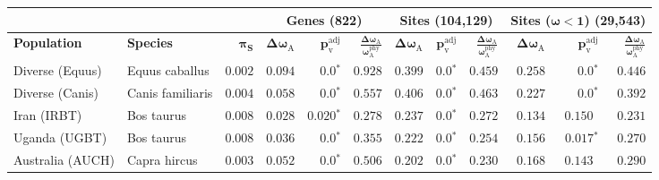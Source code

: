 \documentclass[9pt,twocolumn,twoside,lineno]{pnas-new}
\newcommand{\rateApop}{\omega_{\mathrm{A}}}
\newcommand{\rateAphy}{\rateApop^{\mathrm{phy}}}
\begin{document}
\begin{table*}[tb]
       \centering
       \begin{adjustbox}{width=17.8cm}
       \begin{tabular}{||l|l|r||r|r|r||r|r|r||r|r|r||}
              \toprule
              \multicolumn{3}{||c||}{} &
              \multicolumn{3}{c||}{\textbf{Genes (822)}} &
              \multicolumn{3}{c||}{\textbf{Sites (104,129)}} &
              \multicolumn{3}{c||}{\textbf{Sites ($\bm{\omega < 1}$) (29,543)}}
              \\ \hline
              \textbf{Population} &
              \textbf{Species} &
              $\bm{\pi_{\textrm{S}}}$ &
              $\bm{\Delta \rateApop}$ &
              $\bm{p_{\mathrm{v}}^{\mathrm{adj}}}$    &
              $\bm{\frac{\Delta\rateApop}{\rateAphy}}$ &
              $\bm{\Delta \rateApop}$ &
              $\bm{p_{\mathrm{v}}^{\mathrm{adj}}}$          &
              $\bm{\frac{\Delta\rateApop}{\rateAphy}}$ &
              $\bm{\Delta \rateApop}$ &
              $\bm{p_{\mathrm{v}}^{\mathrm{adj}}}$ &
              $\bm{\frac{\Delta\rateApop}{\rateAphy}}$
              \\                \midrule
              Diverse (Equus)                                     & Equus caballus      & $ 0.002$ & $ 0.094$ & $\bm{0.0{^*}}$    & $ 0.928$ & $ 0.399$ & $\bm{0.0{^*}}$ & $ 0.459$ & $ 0.258$ & $\bm{0.0{^*}}$ & $ 0.446$ \\
              \rowcolor{LIGHTGREY} Diverse (Canis)                & Canis familiaris    & $ 0.004$ & $ 0.058$ & $\bm{0.0{^*}}$                  & $ 0.557$                                                                     & $ 0.406$ & $\bm{0.0{^*}}$ & $ 0.463$ & $ 0.227$ & $\bm{0.0{^*}}$ & $ 0.392$ \\
              Iran (IRBT)                                         & Bos taurus          & $ 0.008$ & $ 0.028$ & $\bm{ 0.020{^*}}$ & $ 0.278$ & $ 0.237$ & $\bm{0.0{^*}}$ & $ 0.272$ & $ 0.134$ & $ 0.150~~$ & $ 0.231$ \\
              Uganda (UGBT)                                       & Bos taurus          & $ 0.008$ & $ 0.036$ & $\bm{0.0{^*}}$    & $ 0.355$ & $ 0.222$ & $\bm{0.0{^*}}$ & $ 0.254$ & $ 0.156$ & $\bm{ 0.017{^*}}$ & $ 0.270$ \\
              \rowcolor{LIGHTGREY} Australia (AUCH)               & Capra hircus        & $ 0.003$ & $ 0.052$ & $\bm{0.0{^*}}$                  & $ 0.506$                                                                     & $ 0.202$ & $\bm{0.0{^*}}$ & $ 0.230$ & $ 0.168$ & $ 0.143~~$ & $ 0.290$ \\

\end{tabular}
\end{adjustbox}
\end{table*}
\end{document}
